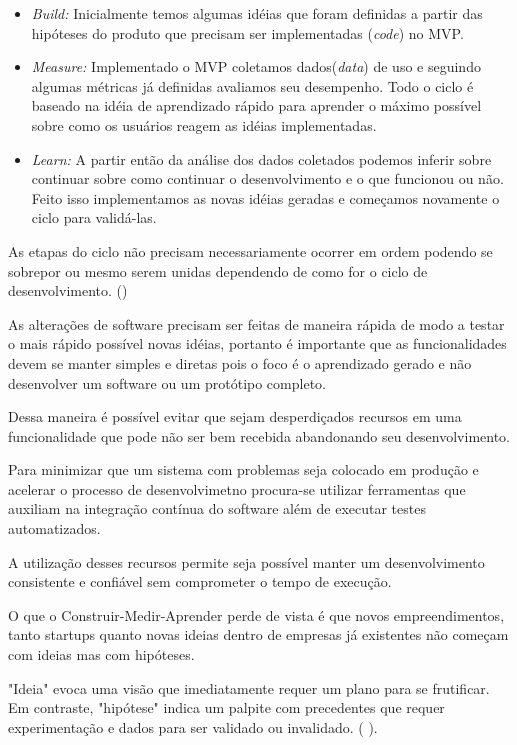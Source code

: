 \begin{itemize}
\item \emph{Build:} Inicialmente temos algumas idéias que foram definidas a partir das hipóteses do produto que precisam ser implementadas (\emph{code}) no MVP.
\item \emph{Measure:} Implementado o MVP coletamos dados(\emph{data}) de uso e seguindo algumas métricas já definidas avaliamos seu desempenho. Todo o ciclo é baseado na idéia de aprendizado rápido para aprender o máximo possível sobre como os usuários reagem as idéias implementadas.
\item \emph{Learn:} A partir então da análise dos dados coletados podemos inferir sobre continuar sobre como continuar o desenvolvimento e o que funcionou ou não. Feito isso implementamos as novas idéias geradas e começamos novamente o ciclo para validá-las.
\end{itemize}
\par As etapas do ciclo não precisam necessariamente ocorrer em ordem podendo se sobrepor  ou mesmo serem unidas dependendo de como for o ciclo de desenvolvimento. (\cite{ries:11}) 
\par As alterações de software precisam ser feitas de maneira rápida de modo a testar o mais rápido possível novas idéias, portanto é importante  que as funcionalidades devem se manter simples e diretas pois o foco é o aprendizado gerado e não desenvolver um software ou um protótipo completo.
\par Dessa maneira é possível evitar que sejam desperdiçados recursos em uma funcionalidade que pode não ser bem recebida abandonando seu desenvolvimento.
\par Para minimizar que um sistema com problemas seja colocado em produção e acelerar o processo de desenvolvimetno procura-se utilizar ferramentas que auxiliam na integração contínua do software além de executar testes automatizados.
\par A utilização desses recursos permite seja possível manter um desenvolvimento consistente e confiável sem comprometer o tempo de execução.
\par O que o Construir-Medir-Aprender perde de vista é que novos empreendimentos, tanto startups quanto novas ideias dentro de empresas já existentes não começam com ideias mas com hipóteses. 
\par "Ideia" evoca uma visão que imediatamente requer um plano para se frutificar. Em contraste, "hipótese" indica um palpite com precedentes que requer experimentação e dados para ser validado ou invalidado. (\cite{blankendeavor} ).
